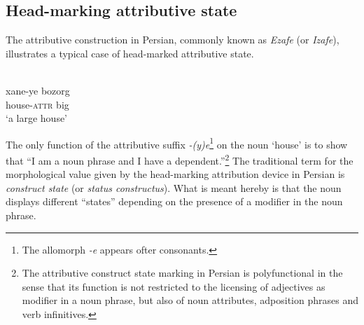 \subsection{Head-marking attributive state} \label{head-marking state}
The attributive construction in Persian, commonly known as \emph{Ezafe} (or \emph{Izafe}), illustrates a typical case of head-marked attributive state.
\begin{exe}
\ex \label{persian constr state}
\\
\gll xane-ye bozorg\\
	house-\textsc{attr} big\\
\glt 	‘a large house’
\end{exe}
The only function of the attributive suffix \textit{-(y)e}\footnote{The allomorph \textit{-e} appears ofter consonants.} on the noun ‘house’ is to show that “I am a noun phrase and I have a dependent.”\footnote{The attributive construct state marking in Persian is polyfunctional in the sense that its function is not restricted to the licensing of adjectives as modifier in a noun phrase, but also of noun attributes, adposition phrases and verb infinitives.} The traditional term for the morphological value given by the head-marking attribution device in Persian is \emph{construct state} (or \emph{status constructus}). What is meant hereby is that the noun displays different “states” depending on the presence of a modifier in the noun phrase.

